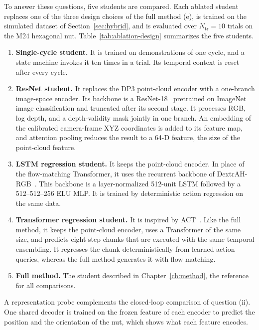 To answer these questions, five students are compared. Each ablated student replaces one of the three design choices of the full method (e), is trained on the simulated dataset of Section~\ref{sec:hybrid}, and is evaluated over $N_{\mathrm{tr}}=10$ trials on the M24 hexagonal nut. Table~\ref{tab:ablation-design} summarizes the five students.
\begin{enumerate}
  \item[(a)] \textbf{Single-cycle student.} It is trained on demonstrations of one cycle, and a state machine invokes it ten times in a trial. Its temporal context is reset after every cycle.
  \item[(b)] \textbf{ResNet student.} It replaces the \ac{DP3} point-cloud encoder with a one-branch image-space encoder. Its backbone is a ResNet-18~\cite{He2016} pretrained on ImageNet image classification and truncated after its second stage. It processes RGB, log depth, and a depth-validity mask jointly in one branch. An embedding of the calibrated camera-frame XYZ coordinates is added to its feature map, and attention pooling reduces the result to a 64-D feature, the size of the point-cloud feature.
  \item[(c)] \textbf{\acs{LSTM} regression student.} It keeps the point-cloud encoder. In place of the flow-matching Transformer, it uses the recurrent backbone of DextrAH-RGB~\cite{Singh2025}. This backbone is a layer-normalized 512-unit \ac{LSTM} followed by a 512--512--256 ELU \acs{MLP}. It is trained by deterministic action regression on the same data.
  \item[(d)] \textbf{Transformer regression student.} It is inspired by \ac{ACT}~\cite{Zhao2023}. Like the full method, it keeps the point-cloud encoder, uses a Transformer of the same size, and predicts eight-step chunks that are executed with the same temporal ensembling. It regresses the chunk deterministically from learned action queries, whereas the full method generates it with flow matching.
  \item[(e)] \textbf{Full method.} The student described in Chapter~\ref{ch:method}, the reference for all comparisons.
\end{enumerate}

A representation probe complements the closed-loop comparison of question (ii). One shared decoder is trained on the frozen feature of each encoder to predict the position and the orientation of the nut, which shows what each feature encodes.

